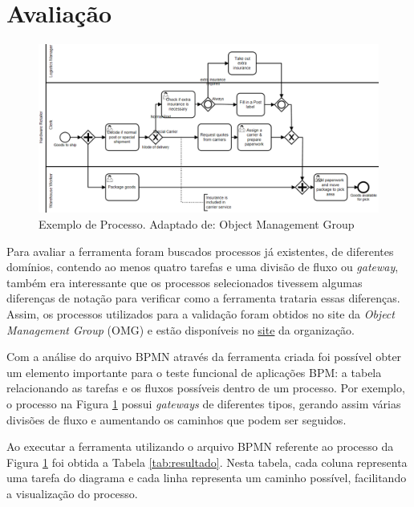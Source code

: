 \documentclass[12pt]{article}
\begin{document}
\section{Avaliação}
\begin{figure}[ht]
\includegraphics[width=.9\textwidth]{figuras/diagrama_exemplo.png}
\caption{Exemplo de Processo. Adaptado de: Object Management Group}
\label{fig:diagrama_exemplo}
\end{figure}

Para avaliar a ferramenta foram buscados processos já existentes, de diferentes domínios, contendo ao menos quatro tarefas e uma divisão de fluxo ou \emph{gateway}, também era interessante que os processos selecionados tivessem algumas diferenças de notação para verificar como a ferramenta trataria essas diferenças. Assim, os processos utilizados para a validação foram obtidos no site da \emph{Object Management Group} (OMG) e estão disponíveis no \href{http://www.omg.org/spec/BPMN/20100602/2010-06-03/}{site} da organização.


Com a análise do arquivo BPMN através da ferramenta criada foi possível obter um elemento importante para o teste funcional de aplicações BPM: a tabela relacionando as tarefas e os fluxos possíveis dentro de um processo. Por exemplo, o processo na Figura \ref{fig:diagrama_exemplo} possui \emph{gateways} de diferentes tipos, gerando assim várias divisões de fluxo e aumentando os caminhos que podem ser seguidos. 

Ao executar a ferramenta utilizando o arquivo BPMN referente ao processo da Figura  \ref{fig:diagrama_exemplo} foi obtida a Tabela \ref{tab:resultado}. Nesta tabela, cada coluna representa uma tarefa do diagrama e cada linha representa um caminho possível, facilitando a visualização do processo. 
\end{document}
